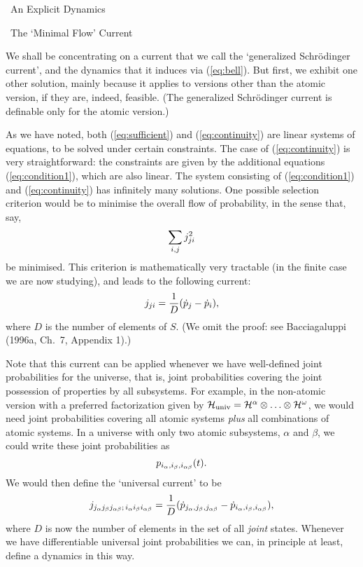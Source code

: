 \documentclass[12pt]{article}
\newcommand{\be}{\vspace*{6pt} \begin{equation}}
\newcommand{\ee}{\vspace*{10pt} \end{equation}}
\renewcommand{\section}[1]{\addtocounter{section}{1}
                           \setcounter{subsection}{0}
                           \setcounter{subsubsection}{0}
                           \vspace{20pt}
                           \begin{center}
                           {\large \thesection \ #1}
                           \end{center}
                           \vspace{20pt}}
\renewcommand{\subsection}[1]{\addtocounter{subsection}{1}
                           \setcounter{subsubsection}{0}
                           \vspace{20pt}
                           \begin{center}
                           \thesubsection \ #1
                           \end{center}
                           \vspace{20pt}}
\newcommand{\cH}{\cal{H}}                                       %
\newcommand{\ga}{\alpha}                                        %
\newcommand{\gb}{\beta}                                         %
\newcommand{\gab}{\alpha\beta}                                  %
\newcommand{\gw}{\omega}                                        %
\begin{document}
\section{An Explicit Dynamics}

\vspace{-30pt}

\subsection{The `Minimal Flow' Current}


We shall be concentrating on a current that we call the `generalized 
Schr\"odinger current', and the dynamics that it induces via 
(\ref{eq:bell}).  But first, we exhibit one other solution, mainly 
because it applies to versions other than the atomic version, if they 
are, indeed, feasible.  (The generalized Schr\"odinger current is 
definable only for the atomic version.)

As we have noted, both (\ref{eq:sufficient}) and (\ref{eq:continuity}) 
are linear systems of equations, to be solved under certain 
constraints.  The case of (\ref{eq:continuity}) is very 
straightforward: the constraints are given by the additional equations 
(\ref{eq:condition1}), which are also linear.  The system consisting 
of (\ref{eq:condition1}) and (\ref{eq:continuity}) has infinitely many 
solutions.  One possible selection criterion would be to minimise the 
overall flow of probability, in the sense that, say,
\be
  \label{eq:minflow}
  \sum_{i,j} j^2_{ji}
\ee
be minimised.  This criterion is mathematically very tractable (in the 
finite case we are now studying), and leads to the following current:
\be
  \label{eq:generalsolution}
  j_{ji} = \frac{1}{D}(\dot{p}_j - \dot{p}_i),
\ee
where $D$ is the number of elements of $S$.  (We omit the proof: see 
Bacciagaluppi (1996a, Ch.~7, Appendix 1).)

Note that this current can be applied whenever we have well-defined 
joint probabilities for the universe, that is, joint probabilities 
covering the joint possession of properties by all subsystems.  For 
example, in the non-atomic version with a preferred factorization 
given by $\cH_{\mbox{\scriptsize univ}} = \cH^{\ga} \otimes
\ldots \otimes \cH^{\gw}$, we would need joint probabilities covering all
atomic systems {\it plus} all combinations of atomic systems.  In a 
universe with only two atomic subsystems, $\ga$ and $\gb$, we could 
write these joint probabilities as
\be
  \label{eq:nonatomic1}
  p_{i_{\ga},i_{\gb},i_{\gab}}(t).
\ee
We would then define the `universal current' to be
\be
  \label{eq:nonatomic2}
  j_{j_{\ga}j_{\gb}j_{\gab};\,i_{\ga}i_{\gb}i_{\gab}} =
  \frac{1}{D}(\dot{p}_{j_{\ga},j_{\gb},j_{\gab}} -
  \dot{p}_{i_{\ga},i_{\gb},i_{\gab}}),
\ee
where $D$ is now the number of elements in the set of all {\it joint} 
states.  Whenever we have differentiable universal joint probabilities 
we can, in principle at least, define a dynamics in this way.
\end{document}
